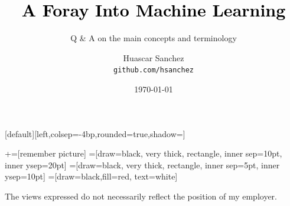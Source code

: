 

\usepackage{framed}
\usepackage[inline]{enumitem}
\usepackage[backend=bibtex]{biblatex}
\usepackage{amssymb}
\usepackage{amsmath}
\usepackage{gensymb}  %
\usepackage{dirtytalk} %

\newcommand{\norm}[1]{\left\lVert #1 \right\rVert}

\usepackage{multirow}
\usepackage{booktabs}

\usepackage{mathtools}
\providecommand\given{}
\DeclarePairedDelimiterXPP\Aver[1]{\mathbb{E}}{[}{]}{}{
\renewcommand\given{  \nonscript\:
  \delimsize\vert
  \nonscript\:
  \mathopen{}
  \allowbreak}
#1
}


\title[]{\Huge \textbf{\textcolor{black}{A Foray Into Machine Learning}}}
\subtitle{\Large Q \& A on the main concepts and terminology}
\author[HAS]{
\parbox[t]{1.5in}{Huascar Sanchez \\\small\texttt{github.com/hsanchez}} %
}

\date{\today}

\makeatletter
{}[default][left,colsep=-4bp,rounded=true,shadow=\beamer@themerounded@shadow]
\makeatother


\newcommand\marktopleft[1]{%
    \tikz[overlay,remember picture]
        \node (marker-#1-a) at (-.3em,.3em) {};%
}
\newcommand\markbottomright[2]{%
    \tikz[overlay,remember picture]
        \node (marker-#1-b) at (0em,0em) {};%
}
+=[remember picture]
 =[draw=black, very thick, rectangle, inner sep=10pt, inner ysep=20pt]
 =[draw=black, very thick, rectangle, inner sep=5pt, inner ysep=10pt]
 =[draw=black,fill=red, text=white]

\begin{frame}
\maketitle
\tiny\hspace{1em}The views expressed do not necessarily reflect the position of my employer.
\end{frame}

